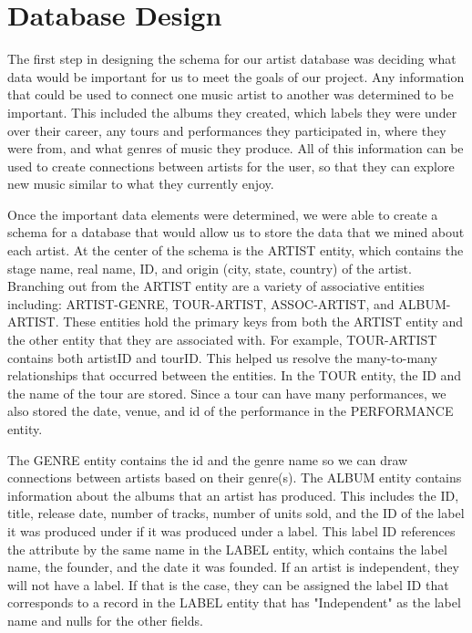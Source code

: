 \documentclass{sig-alternate}
\begin{document}
\section{Database Design}
\label{db design}

The first step in designing the schema for our artist database was deciding what data would be important
for us to meet the goals of our project. Any information that could be used to connect one music artist 
to another was determined to be important. This included the albums they created, which labels they were 
under over their career, any tours and performances they participated in, where they were from, and what 
genres of music they produce. All of this information can be used to create connections between artists for 
the user, so that they can explore new music similar to what they currently enjoy.

Once the important data elements were determined, we were able to create a schema for a database that would 
allow us to store the data that we mined about each artist. At the center of the schema is the ARTIST entity, 
which contains the stage name, real name, ID, and origin (city, state, country) of the artist. Branching out 
from the ARTIST entity are a variety of associative entities including: ARTIST-GENRE, TOUR-ARTIST, ASSOC-ARTIST, 
and ALBUM-ARTIST. These entities hold the primary keys from both the ARTIST entity and the other entity that 
they are associated with. For example, TOUR-ARTIST contains both artistID and tourID. This helped us resolve 
the many-to-many relationships that occurred between the entities. In the TOUR entity, the ID and the name of 
the tour are stored. Since a tour can have many performances, we also stored the date, venue, and id of the 
performance in the PERFORMANCE entity.

The GENRE entity contains the id and the genre name so we can draw connections between artists based on their 
genre(s). The ALBUM entity contains information about the albums that an artist has produced. This includes the 
ID, title, release date, number of tracks, number of units sold, and the ID of the label it was produced under 
if it was produced under a label. This label ID references the attribute by the same name in the LABEL entity, 
which contains the label name, the founder, and the date it was founded. If an artist is independent, they will 
not have a label. If that is the case, they can be assigned the label ID that corresponds to a record in the 
LABEL entity that has "Independent" as the label name and nulls for the other fields.
\end{document}
